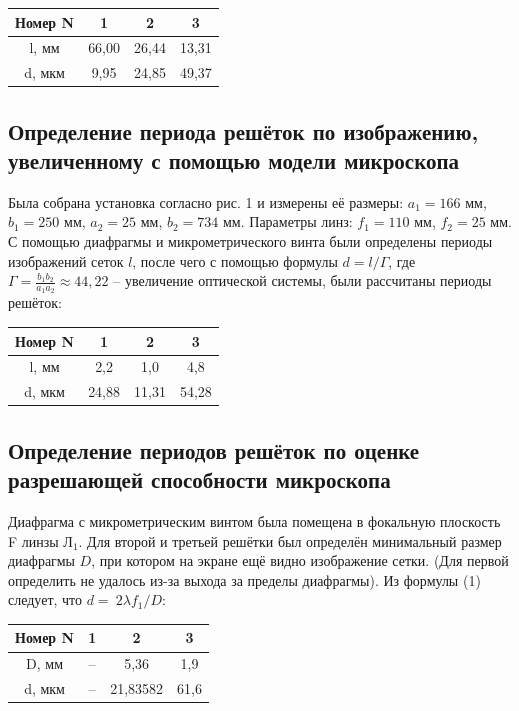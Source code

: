 \documentclass[a4paper,12pt]{article} %
\begin{document}
\begin{table}[H]
\begin{tabular}{|c|c|c|c|} \hline
Номер N & 1    & 2     & 3     \\ \hline
l, мм   & 66,00   & 26,44 & 13,31 \\ \hline
d, мкм  & 9,95 & 24,85 & 49,37 \\ \hline
\end{tabular}
\end{table}


\subsection*{Определение периода решёток по изображению, увеличенному с помощью модели микроскопа}
Была собрана установка согласно рис. 1 и измерены её размеры: $a_1 = 166$ мм, $b_1 = 250$ мм, $a_2 = 25$ мм,  $b_2 = 734$ мм. Параметры линз: $f_1 = 110$ мм, $f_2 = 25$ мм.
С помощью диафрагмы и микрометрического винта были определены периоды изображений сеток $l$,
после чего с помощью формулы $d = l/\Gamma$, где $\Gamma = \frac{b_1b_2}{a_1a_2} \approx 44,22$ -- увеличение оптической системы, были рассчитаны периоды решёток:

\begin{table}[H]
\begin{tabular}{|c|c|c|c|}
\hline
Номер N & 1     & 2     & 3     \\ \hline
l, мм   & 2,2   & 1,0   & 4,8   \\ \hline
d, мкм  & 24,88 & 11,31 & 54,28 \\ \hline
\end{tabular}
\end{table}


\subsection*{Определение периодов решёток по оценке разрешающей способности микроскопа}
Диафрагма с микрометрическим винтом была помещена в фокальную
плоскость F линзы Л$_1$. Для второй и третьей решётки был определён минимальный размер диафрагмы $D$, при котором на экране ещё видно изображение сетки. (Для первой определить не удалось из-за выхода за пределы диафрагмы). Из формулы (1) следует, что $d =~2\lambda f_1 / D$:


\begin{table}[H]
\begin{tabular}{|c|c|c|c|}
\hline
Номер N & 1  & 2        & 3    \\ \hline
D, мм   & -- & 5,36     & 1,9  \\ \hline
d, мкм  & -- & 21,83582 & 61,6 \\ \hline
\end{tabular}
\end{table}
\end{document}
